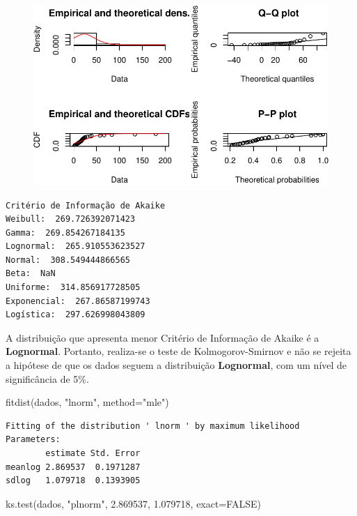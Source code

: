 \documentclass[
  letterpaper,
  DIV=11,
  numbers=noendperiod]{scrartcl}
\newenvironment{Shaded}{\begin{snugshade}}{\end{snugshade}}
\newcommand{\AttributeTok}[1]{\textcolor[rgb]{0.40,0.45,0.13}{#1}}
\newcommand{\ConstantTok}[1]{\textcolor[rgb]{0.56,0.35,0.01}{#1}}
\newcommand{\FloatTok}[1]{\textcolor[rgb]{0.68,0.00,0.00}{#1}}
\newcommand{\FunctionTok}[1]{\textcolor[rgb]{0.28,0.35,0.67}{#1}}
\newcommand{\NormalTok}[1]{\textcolor[rgb]{0.00,0.23,0.31}{#1}}
\newcommand{\StringTok}[1]{\textcolor[rgb]{0.13,0.47,0.30}{#1}}
\begin{document}
\begin{figure}[H]

{\centering \includegraphics{quiz5_files/figure-pdf/unnamed-chunk-35-9.pdf}

}

\end{figure}

\begin{verbatim}
Critério de Informação de Akaike
Weibull:  269.726392071423 
Gamma:  269.854267184135 
Lognormal:  265.910553623527 
Normal:  308.549444866565 
Beta:  NaN 
Uniforme:  314.856917728505 
Exponencial:  267.86587199743 
Logística:  297.626998043809 
\end{verbatim}

A distribuição que apresenta menor Critério de Informação de Akaike é a
\textbf{Lognormal}. Portanto, realiza-se o teste de Kolmogorov-Smirnov e
não se rejeita a hipótese de que os dados seguem a distribuição
\textbf{Lognormal}, com um nível de significância de 5\%.

\begin{Shaded}
\begin{Highlighting}[]
\FunctionTok{fitdist}\NormalTok{(dados, }\StringTok{"lnorm"}\NormalTok{, }\AttributeTok{method=}\StringTok{"mle"}\NormalTok{)}
\end{Highlighting}
\end{Shaded}

\begin{verbatim}
Fitting of the distribution ' lnorm ' by maximum likelihood 
Parameters:
        estimate Std. Error
meanlog 2.869537  0.1971287
sdlog   1.079718  0.1393905
\end{verbatim}

\begin{Shaded}
\begin{Highlighting}[]
\FunctionTok{ks.test}\NormalTok{(dados, }\StringTok{"plnorm"}\NormalTok{, }\FloatTok{2.869537}\NormalTok{, }\FloatTok{1.079718}\NormalTok{, }\AttributeTok{exact=}\ConstantTok{FALSE}\NormalTok{)}
\end{Highlighting}
\end{Shaded}
\end{document}
